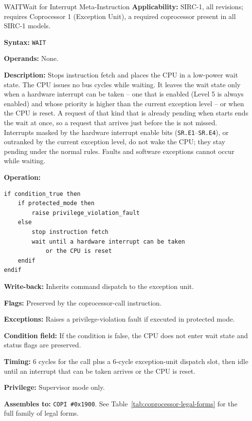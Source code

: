 \begin{instructionbox}{WAIT}{Wait for Interrupt Meta-Instruction}
	\textbf{Applicability:} SIRC-1, all revisions; requires Coprocessor 1 (Exception Unit), a required coprocessor
	present in all SIRC-1 models.

	\textbf{Syntax:} \texttt{WAIT}

	\textbf{Operands:} None.

	\textbf{Description:} Stops instruction fetch and places the CPU in a low-power wait state. The CPU issues no bus
	cycles while waiting. It leaves the wait state only when a hardware interrupt can be taken -- one that is enabled
	(Level 5 is always enabled) and whose priority is higher than the current exception level -- or when the CPU is
	reset. A request of that kind that is already pending when  starts ends the wait at once, so a
	request that arrives just before the  is not missed. Interrupts masked by the hardware interrupt
	enable bits (\texttt{SR.E1}--\texttt{SR.E4}), or outranked by the current exception level, do not wake the CPU; they
	stay pending under the normal rules. Faults and software exceptions cannot occur while waiting.

	\textbf{Operation:}
	\begin{verbatim}
if condition_true then
    if protected_mode then
        raise privilege_violation_fault
    else
        stop instruction fetch
        wait until a hardware interrupt can be taken
			or the CPU is reset
    endif
endif
\end{verbatim}

	\textbf{Write-back:} Inherits  command dispatch to the exception unit.

	\textbf{Flags:} Preserved by the coprocessor-call instruction.

	\textbf{Exceptions:} Raises a privilege-violation fault if executed in protected mode.

	\textbf{Condition field:} If the condition is false, the CPU does not enter wait state and status flags are preserved.

	\textbf{Timing:} 6 cycles for the call plus a 6-cycle exception-unit dispatch slot, then idle until an interrupt that
	can be taken arrives or the CPU is reset.

	\textbf{Privilege:} Supervisor mode only.

	\textbf{Assembles to:} \texttt{COPI \#0x1900}. See Table~\ref{tab:coprocessor-legal-forms} for the full family of legal forms.


\end{instructionbox}
